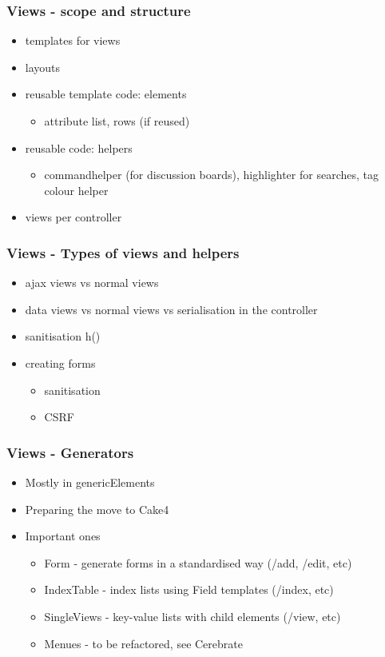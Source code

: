 \begin{frame}
  \frametitle{Views - scope and structure}
  \begin{itemize}
    \item templates for views
    \item layouts
    \item reusable template code: elements
    \begin{itemize}
      \item attribute list, rows (if reused)
    \end{itemize}
    \item reusable code: helpers
    \begin{itemize}
      \item commandhelper (for discussion boards), highlighter for searches, tag colour helper
    \end{itemize}
    \item views per controller
  \end{itemize}
\end{frame}

\begin{frame}
  \frametitle{Views - Types of views and helpers}
  \begin{itemize}
    \item ajax views vs normal views
    \item data views vs normal views vs serialisation in the controller
    \item sanitisation h()
    \item creating forms
    \begin{itemize}
      \item sanitisation
      \item CSRF
    \end{itemize}
  \end{itemize}
\end{frame}

\begin{frame}
  \frametitle{Views - Generators}
  \begin{itemize}
    \item Mostly in genericElements
    \item Preparing the move to Cake4
    \item Important ones
    \begin{itemize}
      \item Form - generate forms in a standardised way (/add, /edit, etc)
      \item IndexTable - index lists using Field templates (/index, etc)
      \item SingleViews - key-value lists with child elements (/view, etc)
      \item Menues - to be refactored, see Cerebrate
    \end{itemize}
  \end{itemize}
\end{frame}

